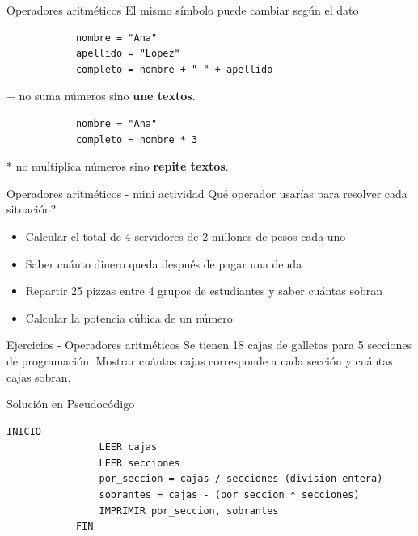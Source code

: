 \documentclass{beamer}
\begin{document}
    \begin{frame}[fragile,t]{Operadores aritméticos}
        El mismo símbolo puede cambiar según el dato
        \begin{verbatim}
            nombre = "Ana"
            apellido = "Lopez"
            completo = nombre + " " + apellido
        \end{verbatim}
        $+$ no suma números sino \textbf{une textos}.
        \begin{verbatim}
            nombre = "Ana"
            completo = nombre * 3
        \end{verbatim}
        $*$ no multiplica números sino \textbf{repite textos}.
    \end{frame}

    \begin{frame}{Operadores aritméticos - mini actividad}
        Qué operador usarías para resolver cada situación?
        \begin{itemize}
            \item Calcular el total de 4 servidores de 2 millones de pesos cada uno
            \item Saber cuánto dinero queda después de pagar una deuda
            \item Repartir 25 pizzas entre 4 grupos de estudiantes y saber cuántas sobran
            \item Calcular la potencia cúbica de un número
        \end{itemize}
    \end{frame}

    \begin{frame}{Ejercicios - Operadores aritméticos}
        Se tienen 18 cajas de galletas para 5 secciones de programación. 
        Mostrar cuántas cajas corresponde a cada sección y cuántas cajas sobran.
    \end{frame}

    \begin{frame}[fragile]{Solución en Pseudocódigo}
        \begin{lstlisting}[language=PseudocodigoES]
            INICIO
                LEER cajas
                LEER secciones
                por_seccion = cajas / secciones (division entera)
                sobrantes = cajas - (por_seccion * secciones)
                IMPRIMIR por_seccion, sobrantes
            FIN
        \end{lstlisting}
    \end{frame}
\end{document}
